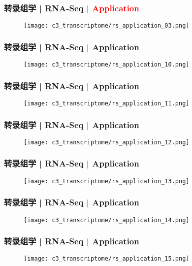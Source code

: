\begin{frame}
  \frametitle{转录组学 | RNA-Seq | \textcolor{red}{Application}}
  \begin{figure}
    \centering
    \texttt{[image: c3\_transcriptome/rs\_application\_03.png]}
  \end{figure}
\end{frame}

\begin{frame}
  \frametitle{转录组学 | RNA-Seq | Application}
  \begin{figure}
    \centering
    \texttt{[image: c3\_transcriptome/rs\_application\_10.png]}
  \end{figure}
\end{frame}

\begin{frame}
  \frametitle{转录组学 | RNA-Seq | Application}
  \begin{figure}
    \centering
    \texttt{[image: c3\_transcriptome/rs\_application\_11.png]}
  \end{figure}
\end{frame}

\begin{frame}
  \frametitle{转录组学 | RNA-Seq | Application}
  \begin{figure}
    \centering
    \texttt{[image: c3\_transcriptome/rs\_application\_12.png]}
  \end{figure}
\end{frame}

\begin{frame}
  \frametitle{转录组学 | RNA-Seq | Application}
  \begin{figure}
    \centering
    \texttt{[image: c3\_transcriptome/rs\_application\_13.png]}
  \end{figure}
\end{frame}

\begin{frame}
  \frametitle{转录组学 | RNA-Seq | Application}
  \begin{figure}
    \centering
    \texttt{[image: c3\_transcriptome/rs\_application\_14.png]}
  \end{figure}
\end{frame}

\begin{frame}
  \frametitle{转录组学 | RNA-Seq | Application}
  \begin{figure}
    \centering
    \texttt{[image: c3\_transcriptome/rs\_application\_15.png]}
  \end{figure}
\end{frame}

